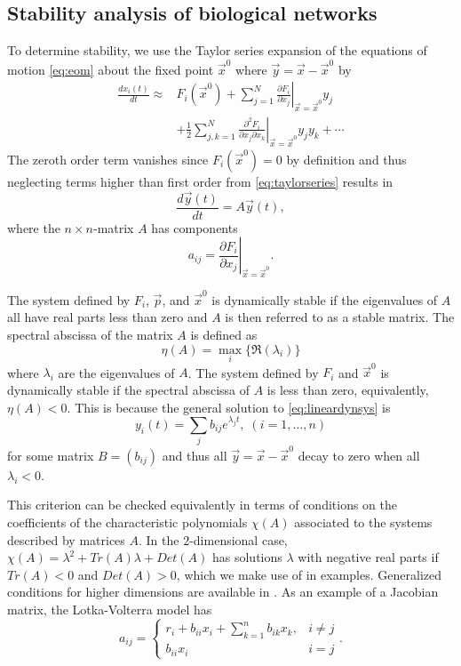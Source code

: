 \subsection{Stability analysis of biological networks}
To determine stability, we use the Taylor series expansion of the equations of motion \ref{eq:eom} about the fixed point $\vec{x}^0$ where $\vec{y} = \vec{x} - \vec{x}^0$ by
\begin{equation}\label{eq:taylorseries}
\begin{aligned}
\frac{dx_i(t)}{dt} \approx & F_i(\vec{x}^0)
+ \sum_{j=1}^{N} \left. \frac{\partial F_i}{\partial x_j} \right|_{\vec{x} = \vec{x}^0} y_j\\
& + \frac{1}{2}\sum_{j,k=1}^{N} \left. \frac{\partial^2 F_i}{\partial x_j \partial x_k} \right|_{\vec{x} = \vec{x}^0} y_j y_k + \cdots
\end{aligned}
\end{equation}
The zeroth order term vanishes since $F_i(\vec{x}^0)=0$ by definition and thus neglecting terms higher than first order from \ref{eq:taylorseries} results in
\begin{equation}\label{eq:lineardynsys}
\frac{d\vec{y}(t)}{dt} = A \vec{y}(t),
\end{equation}
where the $n \times n$-matrix $A$ has components
$$
a_{ij} = \left. \frac{\partial F_i}{\partial x_j} \right|_{\vec{x} = \vec{x}^0}.
$$

The system defined by $F_i$, $\vec{p}$, and $\vec{x}^0$ is dynamically stable if the eigenvalues of $A$ all have real parts less than zero and $A$ is then referred to as a stable matrix. The spectral abscissa of the matrix $A$ is defined as
$$
\eta(A) = \max_i \{\Re(\lambda_i)\}
$$
where $\lambda_i$ are the eigenvalues of $A$. The system defined by $F_i$ and $\vec{x}^0$ is dynamically stable if the spectral abscissa of $A$ is less than zero, equivalently, $\eta(A) < 0$. This is because the general solution to \ref{eq:lineardynsys} is
$$
y_i(t) = \sum_j b_{ij} e^{\lambda_j t}, \; (i=1,\ldots,n)
$$
for some matrix $B=(b_{ij})$ and thus all $\vec{y} = \vec{x} - \vec{x}^0$ decay to zero when all $\lambda_i < 0$.

This criterion can be checked equivalently in terms of conditions on the coefficients of the characteristic polynomials $\chi(A)$ associated to the systems described by matrices $A$. In the $2$-dimensional case, $\chi(A) = \lambda^2 + Tr(A)\lambda+Det(A)$ has solutions $\lambda$ with negative real parts if $Tr(A)<0$ and $Det(A)>0$, which we make use of in examples. Generalized conditions for higher dimensions are available in \cite{Gantmacher1959}. As an example of a Jacobian matrix, the Lotka-Volterra model has
 \begin{equation}\label{eq:lotkavolterrajacobian}
   a_{ij} = \left\{
     \begin{array}{lr}
       r_i + b_{ii} x_i + \sum_{k=1}^{n} b_{ik} x_{k}, & i \neq j\\
       b_{ii} x_i & i=j
     \end{array}.
   \right.
\end{equation}

